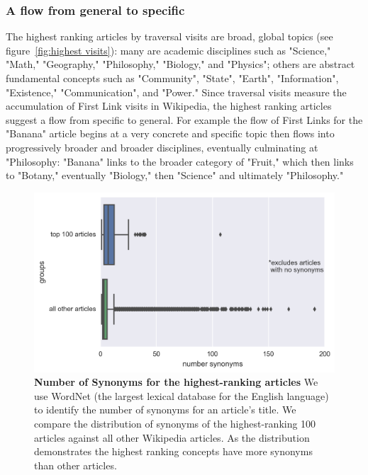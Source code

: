 \documentclass[pre,twocolumn,twoside,superscriptaddress,floatfix, aps, 10pt]{revtex4-1}
\begin{document}
\subsubsection{A flow from general to specific}

The highest ranking articles by traversal visits are 
broad, global topics
(see figure~\ref{fig:highest visits}):
many are academic disciplines such as "Science," "Math," 
"Geography," "Philosophy," "Biology," and "Physics"; others are abstract fundamental concepts such as 
"Community", "State", "Earth", "Information", 
"Existence," "Communication", and "Power."
Since traversal visits measure the accumulation of First Link visits in Wikipedia, 
the highest ranking articles suggest a flow from specific to general. 
For example the flow of First Links for the "Banana" article begins at a very concrete
and specific topic then flows into progressively broader and broader disciplines, eventually 
culminating at "Philosophy: "Banana" links to the broader category of "Fruit," which then links to 
"Botany," eventually "Biology," then "Science" and ultimately "Philosophy." 


\begin{figure}[tp!]
  \centering	
  \includegraphics[width=\columnwidth]{graphics/synonyms.png}
  \caption{
    \textbf{Number of Synonyms for the highest-ranking articles}
    We use WordNet (the largest lexical database for the English language)
    to identify the number of synonyms for an article's title. We compare 
    the distribution of synonyms of the highest-ranking 100 articles
    against all other Wikipedia articles. As the distribution demonstrates
    the highest ranking concepts have more synonyms than other articles.
  }
  \label{fig:synonyms}
\end{figure}
\end{document}
